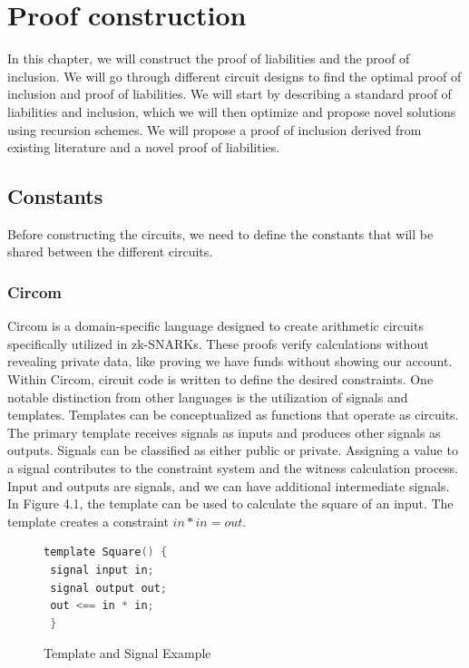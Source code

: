 
\chapter{Proof construction}
In this chapter, we will construct the proof of liabilities and the proof of inclusion. 
We will go through different circuit designs to find the optimal proof of inclusion and proof of liabilities.
We will start by describing a standard proof of liabilities and inclusion, which we will then optimize and propose novel solutions using recursion schemes.
We will propose a proof of inclusion derived from existing literature and a novel proof of liabilities. 


\section{Constants}
Before constructing the circuits, we need to define the constants that will be shared between the
different circuits.


\subsection{Circom} 

Circom is a domain-specific language designed to create arithmetic circuits specifically utilized in zk-SNARKs. These proofs verify calculations without revealing private data, like proving we have funds without showing our account.
Within Circom, circuit code is written to define the desired constraints. One notable distinction from other languages is the utilization of signals and templates.
Templates can be conceptualized as functions that operate as circuits. The primary template receives signals as inputs and produces other signals as outputs. Signals can be classified as either public or private.
Assigning a value to a signal contributes to the constraint system and the witness calculation process.
Input and outputs are signals, and we can have additional intermediate signals.
In Figure 4.1, the template can be used to calculate the square of an input. The template creates a constraint $in * in = out$.

\begin{figure}[h]
   \centering
   \begin{lstlisting}[language=C, basicstyle=\ttfamily\small]
 template Square() {
 signal input in;
 signal output out;
 out <== in * in;
 }
   \end{lstlisting}
   \caption{Template and Signal Example}
   \label{fig:square}
   \end{figure}

